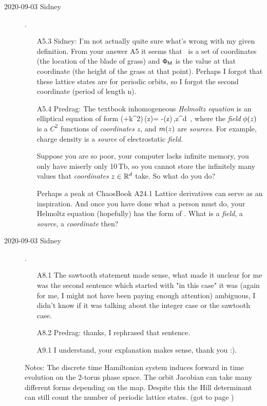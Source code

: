 \begin{description}
\item[2020-09-03 Sidney].
\begin{itemize}
	\item[A5.3] Sidney:
I'm not actually quite sure what's wrong with my given definition. From
your answer A5 it seems that \Mm\ is a set of
coordinates (the location of the blade of grass) and $\mathsf{\Phi}_{\mathsf{M}}$ is
the value at that coordinate (the height of the grass at that point).
Perhaps I forgot that these lattice states are for periodic orbits, so I
forgot the second coordinate (period of length n).
	\item[A5.4] Predrag: %
The textbook inhomogeneous \emph{Helmoltz equation} is an elliptical
equation of form
\beq
   (\Box+k^2)\,\ssp(z)= -\m(z)\,,\qquad z\in \reals^d
\,,
\label{CatMapContinuesPC}
\eeq
where the \emph{field} $\phi(z)$ is a $C^2$ functions of
\emph{coordinates} $z$, and $m(z)$ are \emph{sources}. For example,
charge density is a \emph{source} of electrostatic \emph{field}.

Suppose you are so poor, your computer lacks infinite memory, you only
have miserly only 10\,Tb, so you cannot store the infinitely many values
that \emph{coordinates} $z\in \mathbb{R}^d$ take. So what do you do?

Perhaps a peak at ChaosBook
 {A24.1
Lattice derivatives} can serve as an inspiration. And once you have done
what a person must do, your Helmoltz equation (hopefully) has the form of
.
What is a \emph{field}, a \emph{source}, a \emph{coordinate} then?
\end{itemize}


\item[2020-09-03 Sidney].
\begin{itemize}
	\item[A8.1]
The sawtooth statement made sense, what made it unclear for me was the second sentence which started with "in this case" it was (again for me, I might not have been paying enough attention) ambiguous, I didn't know if it was talking about the integer case or the sawtooth case.  	
	\item[A8.2] Predrag: thanks, I rephrased that sentence.
	\item[A9.1]
I understand, your explanation makes sense, thank you :).
\end{itemize}

\vspace{3mm}

Notes: The discrete time Hamiltonian system induces forward in time evolution on the 2-torus phase space. The orbit Jacobian can take many different forms depending on the map. Despite this the Hill determinant can still count the number of periodic lattice states.
(got to page )


\end{description}
